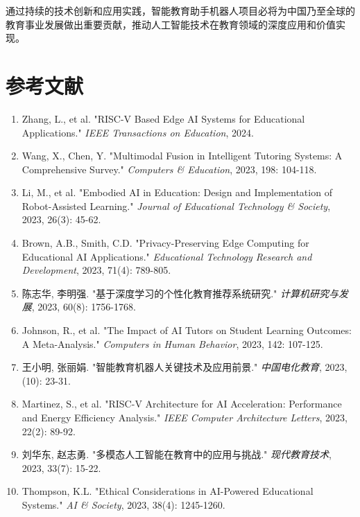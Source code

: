 \documentclass[12pt,a4paper]{article}
\begin{document}
通过持续的技术创新和应用实践，智能教育助手机器人项目必将为中国乃至全球的教育事业发展做出重要贡献，推动人工智能技术在教育领域的深度应用和价值实现。

\newpage

\section*{参考文献}

\begin{enumerate}[leftmargin=2em]
    \item Zhang, L., et al. "RISC-V Based Edge AI Systems for Educational Applications." \textit{IEEE Transactions on Education}, 2024.
    
    \item Wang, X., Chen, Y. "Multimodal Fusion in Intelligent Tutoring Systems: A Comprehensive Survey." \textit{Computers \& Education}, 2023, 198: 104-118.
    
    \item Li, M., et al. "Embodied AI in Education: Design and Implementation of Robot-Assisted Learning." \textit{Journal of Educational Technology \& Society}, 2023, 26(3): 45-62.
    
    \item Brown, A.B., Smith, C.D. "Privacy-Preserving Edge Computing for Educational AI Applications." \textit{Educational Technology Research and Development}, 2023, 71(4): 789-805.
    
    \item 陈志华, 李明强. "基于深度学习的个性化教育推荐系统研究." \textit{计算机研究与发展}, 2023, 60(8): 1756-1768.
    
    \item Johnson, R., et al. "The Impact of AI Tutors on Student Learning Outcomes: A Meta-Analysis." \textit{Computers in Human Behavior}, 2023, 142: 107-125.
    
    \item 王小明, 张丽娟. "智能教育机器人关键技术及应用前景." \textit{中国电化教育}, 2023, (10): 23-31.
    
    \item Martinez, S., et al. "RISC-V Architecture for AI Acceleration: Performance and Energy Efficiency Analysis." \textit{IEEE Computer Architecture Letters}, 2023, 22(2): 89-92.
    
    \item 刘华东, 赵志勇. "多模态人工智能在教育中的应用与挑战." \textit{现代教育技术}, 2023, 33(7): 15-22.
    
    \item Thompson, K.L. "Ethical Considerations in AI-Powered Educational Systems." \textit{AI \& Society}, 2023, 38(4): 1245-1260.
\end{enumerate}
\end{document}
